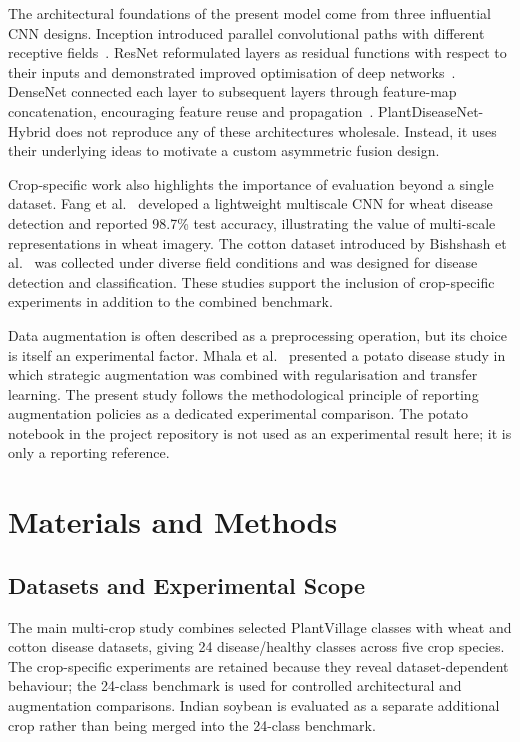 \documentclass[a4paper,fleqn]{cas-dc}
\begin{document}
The architectural foundations of the present model come from three influential CNN designs. Inception introduced parallel convolutional paths with different receptive fields~\citep{szegedy2015}. ResNet reformulated layers as residual functions with respect to their inputs and demonstrated improved optimisation of deep networks~\citep{he2016}. DenseNet connected each layer to subsequent layers through feature-map concatenation, encouraging feature reuse and propagation~\citep{huang2017}. PlantDiseaseNet-Hybrid does not reproduce any of these architectures wholesale. Instead, it uses their underlying ideas to motivate a custom asymmetric fusion design.

Crop-specific work also highlights the importance of evaluation beyond a single dataset. Fang et al.~\citep{fang2023} developed a lightweight multiscale CNN for wheat disease detection and reported 98.7\% test accuracy, illustrating the value of multi-scale representations in wheat imagery. The cotton dataset introduced by Bishshash et al.~\citep{cotton2024} was collected under diverse field conditions and was designed for disease detection and classification. These studies support the inclusion of crop-specific experiments in addition to the combined benchmark.

Data augmentation is often described as a preprocessing operation, but its choice is itself an experimental factor. Mhala et al.~\citep{mhala2025} presented a potato disease study in which strategic augmentation was combined with regularisation and transfer learning. The present study follows the methodological principle of reporting augmentation policies as a dedicated experimental comparison. The potato notebook in the project repository is not used as an experimental result here; it is only a reporting reference.

\section{Materials and Methods}
\subsection{Datasets and Experimental Scope}
The main multi-crop study combines selected PlantVillage classes with wheat and cotton disease datasets, giving 24 disease/healthy classes across five crop species. The crop-specific experiments are retained because they reveal dataset-dependent behaviour; the 24-class benchmark is used for controlled architectural and augmentation comparisons. Indian soybean is evaluated as a separate additional crop rather than being merged into the 24-class benchmark.
\end{document}
